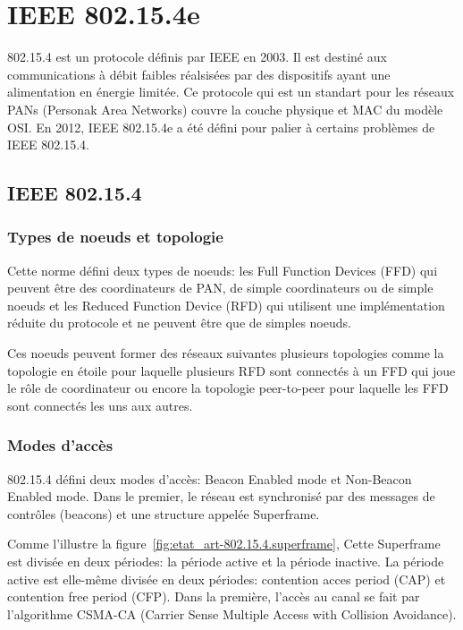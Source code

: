 \section{IEEE 802.15.4e}\label{sec:etat_art-802.15.4}
\renewcommand{\rightmark}{IEEE 802.15.4e}
    802.15.4 est un protocole définis par IEEE en 2003. Il est destiné aux communications à débit faibles réalsisées par des dispositifs ayant une alimentation en énergie limitée.
    Ce protocole qui est un standart pour les réseaux PANs (Personak Area Networks) couvre la couche physique et MAC du modèle OSI. En 2012, IEEE 802.15.4e a été défini pour palier à certains problèmes de IEEE 802.15.4.

\subsection*{IEEE 802.15.4}
    \subsubsection*{Types de noeuds et topologie}
    Cette norme défini deux types de noeuds: les Full Function Devices (FFD) qui peuvent être des coordinateurs de PAN, de simple coordinateurs ou de simple noeuds et les Reduced Function Device (RFD) qui utilisent une implémentation réduite du protocole et ne peuvent être que de simples noeuds.

    Ces noeuds peuvent former des réseaux suivantes plusieurs topologies
    comme la topologie en étoile pour laquelle plusieurs RFD sont connectés à un FFD qui
    joue le rôle de coordinateur ou encore la topologie peer-to-peer pour laquelle les FFD sont connectés les uns aux autres.

    \subsubsection*{Modes d'accès}
    802.15.4 défini deux modes d'accès: Beacon Enabled mode et Non-Beacon Enabled mode.
    Dans le premier, le réseau est synchronisé par des messages de contrôles (beacons)
    et une structure appelée Superframe.

    Comme l'illustre la figure~\ref{fig:etat_art-802.15.4.superframe}, Cette Superframe est divisée en deux périodes: la période active et la période inactive. La période active est elle-même divisée en deux périodes: contention acces period (CAP) et contention free period (CFP). Dans la première, l'accès au canal se fait par l'algorithme CSMA-CA (Carrier Sense Multiple Access with Collision Avoidance).
    
